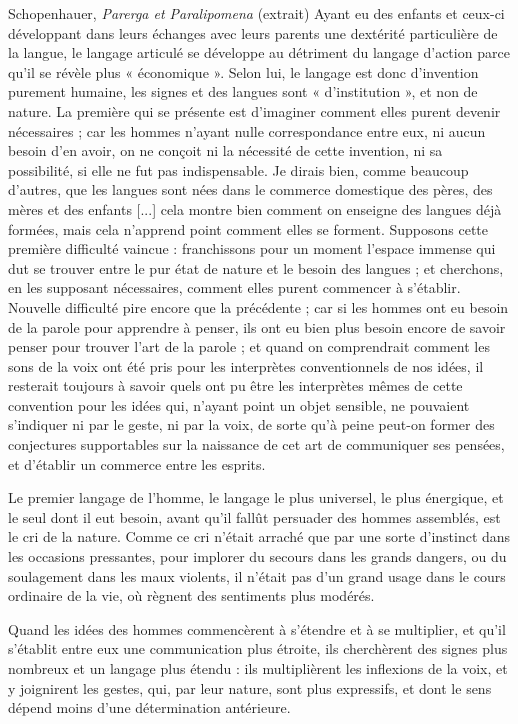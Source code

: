 \begin{bbcomplement}{Schopenhauer, \textit{Parerga et Paralipomena} (extrait)}
Ayant eu des enfants et ceux-ci développant dans leurs échanges avec leurs parents une dextérité particulière de la langue, le langage articulé se développe au détriment du langage d’action parce qu’il se révèle plus « économique ». Selon lui, le langage est donc d’invention purement humaine, les signes et des langues sont « d’institution », et non de nature. La première qui se présente est d’imaginer comment elles purent devenir nécessaires ; car les hommes n’ayant nulle correspondance entre eux, ni aucun besoin d’en avoir, on ne conçoit ni la nécessité de cette invention, ni sa possibilité, si elle ne fut pas indispensable. Je dirais bien, comme beaucoup d’autres, que les langues sont nées dans le commerce domestique des pères, des mères et des enfants [...] cela montre bien comment on enseigne des langues déjà formées, mais cela n’apprend point comment elles se forment. Supposons cette première difficulté vaincue : franchissons pour un moment l’espace immense qui dut se trouver entre le pur état de nature et le besoin des langues ; et cherchons, en les supposant nécessaires, comment elles purent commencer à s’établir. Nouvelle difficulté pire encore que la précédente ; car si les hommes ont eu besoin de la parole pour apprendre à penser, ils ont eu bien plus besoin encore de savoir penser pour trouver l’art de la parole ; et quand on comprendrait comment les sons de la voix ont été pris pour les interprètes conventionnels de nos idées, il resterait toujours à savoir quels ont pu être les interprètes mêmes de cette convention pour les idées qui, n’ayant point un objet sensible, ne pouvaient s’indiquer ni par le geste, ni par la voix, de sorte qu’à peine peut-on former des conjectures supportables sur la naissance de cet art de communiquer ses pensées, et d’établir un commerce entre les esprits.

Le premier langage de l’homme, le langage le plus universel, le plus énergique, et le seul dont il eut besoin, avant qu’il fallût persuader des hommes assemblés, est le cri de la nature. Comme ce cri n’était arraché que par une sorte d’instinct dans les occasions pressantes, pour implorer du secours dans les grands dangers, ou du soulagement dans les maux violents, il n’était pas d’un grand usage dans le cours ordinaire de la vie, où règnent des sentiments plus modérés.

Quand les idées des hommes commencèrent à s’étendre et à se multiplier, et qu’il s’établit entre eux une communication plus étroite, ils cherchèrent des signes plus nombreux et un langage plus étendu : ils multiplièrent les inflexions de la voix, et y joignirent les gestes, qui, par leur nature, sont plus expressifs, et dont le sens dépend moins d’une détermination antérieure.


\end{bbcomplement}
